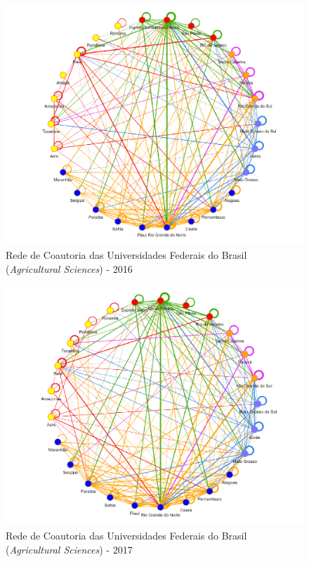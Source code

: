\begin{figure}[H]
	\centering
	\includegraphics[width=\linewidth]{Imagens/rede-agr-br-2016.pdf}
	\caption{Rede de Coautoria das Universidades Federais do Brasil (\textit{Agricultural Sciences}) - 2016}
	\label{Rede de Coautoria - UF AGRI BR 2016}
\end{figure}

\begin{figure}[H]
	\centering
	\includegraphics[width=\linewidth]{Imagens/rede-agr-br-2017.pdf}
	\caption{Rede de Coautoria das Universidades Federais do Brasil (\textit{Agricultural Sciences}) - 2017}
	\label{Rede de Coautoria - UF AGRI BR 2017}
\end{figure}

